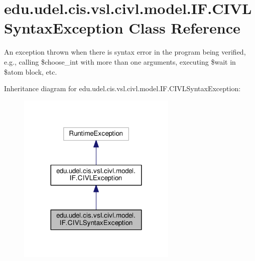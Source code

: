 \hypertarget{classedu_1_1udel_1_1cis_1_1vsl_1_1civl_1_1model_1_1IF_1_1CIVLSyntaxException}{}\section{edu.\+udel.\+cis.\+vsl.\+civl.\+model.\+I\+F.\+C\+I\+V\+L\+Syntax\+Exception Class Reference}
\label{classedu_1_1udel_1_1cis_1_1vsl_1_1civl_1_1model_1_1IF_1_1CIVLSyntaxException}


An exception thrown when there is syntax error in the program being verified, e.\+g., calling \$choose\+\_\+int with more than one arguments, executing \$wait in \$atom block, etc.  




Inheritance diagram for edu.\+udel.\+cis.\+vsl.\+civl.\+model.\+I\+F.\+C\+I\+V\+L\+Syntax\+Exception\+:
\nopagebreak
\begin{figure}[H]
\begin{center}
\leavevmode
\includegraphics[width=215pt]{classedu_1_1udel_1_1cis_1_1vsl_1_1civl_1_1model_1_1IF_1_1CIVLSyntaxException__inherit__graph}
\end{center}
\end{figure}


